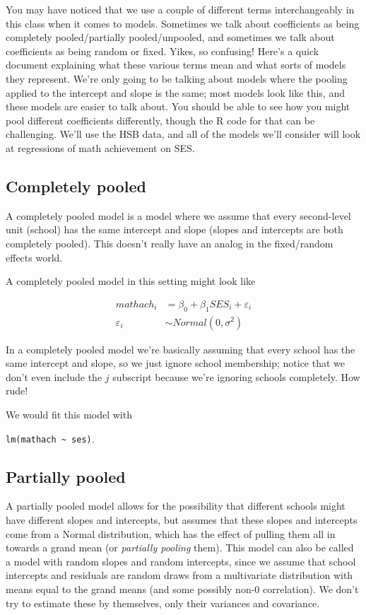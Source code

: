 \documentclass[
  letterpaper,
  DIV=11,
  numbers=noendperiod]{scrreprt}
\begin{document}
You may have noticed that we use a couple of different terms
interchangeably in this class when it comes to models. Sometimes we talk
about coefficients as being completely pooled/partially pooled/unpooled,
and sometimes we talk about coefficients as being random or fixed.
Yikes, so confusing! Here's a quick document explaining what these
various terms mean and what sorts of models they represent. We're only
going to be talking about models where the pooling applied to the
intercept and slope is the same; most models look like this, and these
models are easier to talk about. You should be able to see how you might
pool different coefficients differently, though the R code for that can
be challenging. We'll use the HSB data, and all of the models we'll
consider will look at regressions of math achievement on SES.

\hypertarget{completely-pooled}{%
\subsection{Completely pooled}\label{completely-pooled}}

A completely pooled model is a model where we assume that every
second-level unit (school) has the same intercept and slope (slopes and
intercepts are both completely pooled). This doesn't really have an
analog in the fixed/random effects world.

A completely pooled model in this setting might look like

\[\begin{aligned}
    mathach_i &= \beta_0 + \beta_1SES_i + \varepsilon_i \\
    \varepsilon_i &\sim Normal(0, \sigma^2)
\end{aligned}\]

In a completely pooled model we're basically assuming that every school
has the same intercept and slope, so we just ignore school membership;
notice that we don't even include the \(j\) subscript because we're
ignoring schools completely. How rude!

We would fit this model with

\texttt{lm(mathach\ \textasciitilde{}\ ses)}.

\hypertarget{partially-pooled}{%
\subsection{Partially pooled}\label{partially-pooled}}

A partially pooled model allows for the possibility that different
schools might have different slopes and intercepts, but assumes that
these slopes and intercepts come from a Normal distribution, which has
the effect of pulling them all in towards a grand mean (or
\emph{partially pooling} them). This model can also be called a model
with random slopes and random intercepts, since we assume that school
intercepts and residuals are random draws from a multivariate
distribution with means equal to the grand means (and some possibly
non-0 correlation). We don't try to estimate these by themselves, only
their variances and covariance.
\end{document}

